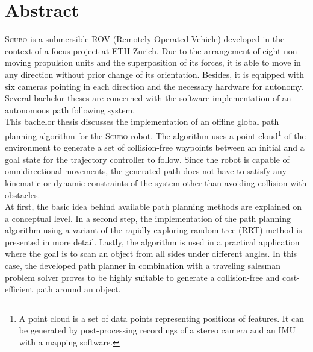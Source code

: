 \chapter*{Abstract}

\textsc{Scubo} is a submersible ROV (Remotely Operated Vehicle) developed in the context of a focus project at ETH Zurich. Due to the arrangement of eight non-moving propulsion units and the superposition of its forces, it is able to move in any direction without prior change of its orientation. Besides, it is equipped with six cameras pointing in each direction and the necessary hardware for autonomy. Several bachelor theses are concerned with the software implementation of an autonomous path following system. \\  

This bachelor thesis discusses the implementation of an offline global path planning algorithm for the \textsc{Scubo} robot. The algorithm uses a point cloud\footnote{A point cloud is a set of data points representing positions of features. It can be generated by post-processing recordings of a stereo camera and an IMU with a mapping software.} of the environment to generate a set of collision-free waypoints between an initial and a goal state for the trajectory controller to follow. Since the robot is capable of omnidirectional movements, the generated path does not have to satisfy any kinematic or dynamic constraints of the system other than avoiding collision with obstacles. \\

At first, the basic idea behind available path planning methods are explained on a conceptual level. In a second step, the implementation of the path planning algorithm using a variant of the rapidly-exploring random tree (RRT) method is presented in more detail. Lastly, the algorithm is used in a practical application where the goal is to scan an object from all sides under different angles. In this case, the developed path planner in combination with a traveling salesman problem solver proves to be highly suitable to generate a collision-free and cost-efficient path around an object.   


